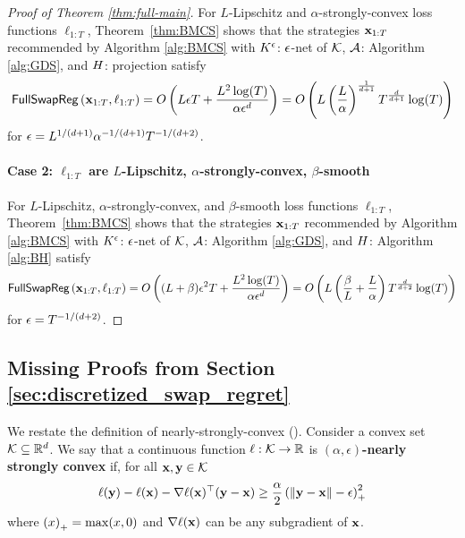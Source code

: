 \begin{proof}[Proof of Theorem \ref{thm:full-main}]
    For $L$-Lipschitz and $\alpha$-strongly-convex loss functions $\ell_{1:T}$, Theorem~\ref{thm:BMCS} shows that the strategies $\mathbf{x}_{1:T}$ recommended by Algorithm \ref{alg:BMCS} with $K^{\epsilon}$: $\epsilon$-net of $\mathcal{K}$, $\mathcal{A}$: Algorithm \ref{alg:GDS}, and $H$: projection satisfy
    \begin{equation*}
        \mathsf{FullSwapReg}\left(\mathbf{x}_{1:T},\ell_{1:T}\right) = O\left(L \epsilon T + \frac{L^2 \log(T)}{\alpha \epsilon^d}\right) = O\left(L\left(\frac{L}{\alpha}\right)^{\frac{1}{d+1}}T^{\frac{d}{d+1}}\log(T)\right)
    \end{equation*}
    for $\epsilon = L^{1/(d+1)}\alpha^{-1/(d+1)}T^{-1/(d+2)}$.

    \paragraph{Case 2: $\ell_{1:T}$ are $L$-Lipschitz, $\alpha$-strongly-convex, $\beta$-smooth}

    For $L$-Lipschitz, $\alpha$-strongly-convex, and $\beta$-smooth loss functions $\ell_{1:T}$, Theorem~\ref{thm:BMCS} shows that the strategies $\mathbf{x}_{1:T}$ recommended by Algorithm \ref{alg:BMCS} with $K^{\epsilon}$: $\epsilon$-net of $\mathcal{K}$, $\mathcal{A}$: Algorithm \ref{alg:GDS}, and $H$: Algorithm \ref{alg:BH} satisfy
    \begin{equation*}
        \mathsf{FullSwapReg}\left(\mathbf{x}_{1:T},\ell_{1:T}\right) = O\left((L+\beta) \epsilon^2 T + \frac{L^2 \log(T)}{\alpha \epsilon^d}\right) = O\left(L\left(\frac{\beta}{L}+\frac{L}{\alpha}\right)T^{\frac{d}{d+2}}\log(T)\right)
    \end{equation*}
    for $\epsilon = T^{-1/(d+2)}$.  
\end{proof}


\subsection{Missing Proofs from Section \ref{sec:discretized_swap_regret}}\label{appendix:discretized_swap_regret}

We restate the definition of nearly-strongly-convex ().  Consider a convex set $\mathcal{K} \subseteq \mathbb{R}^d$.  We say that a continuous function $\ell: \mathcal{K} \to \mathbb{R}$ is \textbf{$(\alpha,\epsilon)$-nearly strongly convex} if, for all $\mathbf{x},\mathbf{y} \in \mathcal{K}$
    \begin{equation}
        \ell(\mathbf{y})-\ell(\mathbf{x})-\nabla \ell(\mathbf{x})^\top(\mathbf{y}-\mathbf{x}) \geq \frac{\alpha}{2}\left(\left\|\mathbf{y}-\mathbf{x}\right\|-\epsilon\right)_+^2
    \end{equation}
    where $\left(x\right)_+ = \max(x,0)$ and $\nabla \ell(\mathbf{x})$ can be any subgradient of $\mathbf{x}$.

